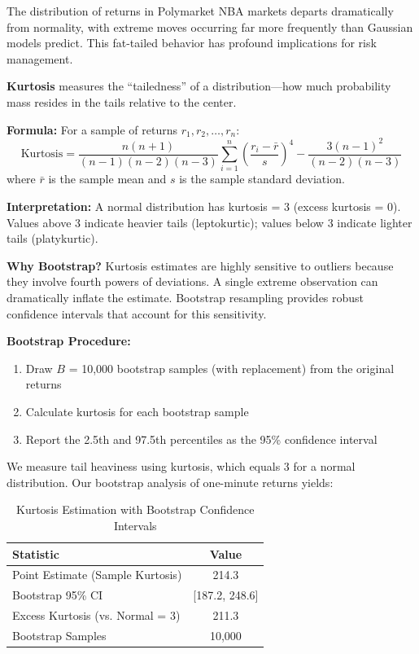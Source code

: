 The distribution of returns in Polymarket NBA markets departs dramatically from normality, with extreme moves occurring far more frequently than Gaussian models predict. This fat-tailed behavior has profound implications for risk management.

\begin{methodbox}
\textbf{Kurtosis} measures the ``tailedness'' of a distribution---how much probability mass resides in the tails relative to the center.

\textbf{Formula:} For a sample of returns $r_1, r_2, \ldots, r_n$:
\begin{equation}
\text{Kurtosis} = \frac{n(n+1)}{(n-1)(n-2)(n-3)} \sum_{i=1}^{n} \left(\frac{r_i - \bar{r}}{s}\right)^4 - \frac{3(n-1)^2}{(n-2)(n-3)}
\end{equation}
where $\bar{r}$ is the sample mean and $s$ is the sample standard deviation.

\textbf{Interpretation:} A normal distribution has kurtosis = 3 (excess kurtosis = 0). Values above 3 indicate heavier tails (leptokurtic); values below 3 indicate lighter tails (platykurtic).

\textbf{Why Bootstrap?} Kurtosis estimates are highly sensitive to outliers because they involve fourth powers of deviations. A single extreme observation can dramatically inflate the estimate. Bootstrap resampling provides robust confidence intervals that account for this sensitivity.

\textbf{Bootstrap Procedure:}
\begin{enumerate}
    \item Draw $B$ = 10,000 bootstrap samples (with replacement) from the original returns
    \item Calculate kurtosis for each bootstrap sample
    \item Report the 2.5th and 97.5th percentiles as the 95\% confidence interval
\end{enumerate}
\end{methodbox}

We measure tail heaviness using kurtosis, which equals 3 for a normal distribution. Our bootstrap analysis of one-minute returns yields:

\begin{table}[H]
\centering
\caption{Kurtosis Estimation with Bootstrap Confidence Intervals}
\label{tab:kurtosis}
\begin{tabular}{lc}
\toprule
\textbf{Statistic} & \textbf{Value} \\
\midrule
Point Estimate (Sample Kurtosis) & 214.3 \\
Bootstrap 95\% CI & [187.2, 248.6] \\
Excess Kurtosis (vs. Normal = 3) & 211.3 \\
Bootstrap Samples & 10,000 \\
\bottomrule
\end{tabular}
\end{table}

